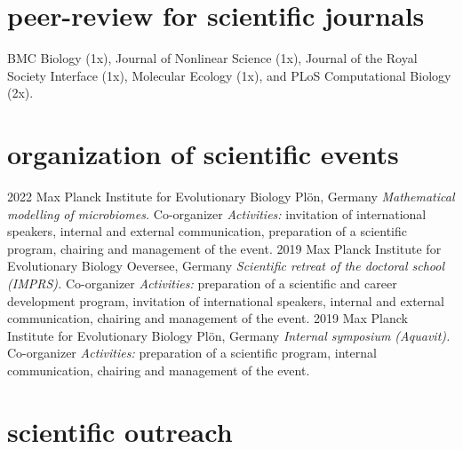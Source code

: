 \documentclass[]{friggeri-cv} %
\begin{document}
\section{peer-review for scientific journals}
BMC Biology (1x),  Journal of Nonlinear Science (1x), Journal of the Royal Society Interface (1x), Molecular Ecology (1x), and PLoS Computational Biology (2x).

\section{organization of scientific events}

\begin{entrylist}
\entry
{2022}
{}
{Max Planck Institute for Evolutionary Biology}
{Plön, Germany}
{{\normalsize\emph{Mathematical modelling of microbiomes.} Co-organizer}}
{\emph{Activities:} invitation of international speakers, internal and external communication, preparation of a scientific program, chairing and management of the event.}
\entry
{2019}
{}
{Max Planck Institute for Evolutionary Biology}
{Oeversee, Germany}
{{\normalsize\emph{Scientific retreat of the doctoral school (IMPRS).} Co-organizer}}
{\emph{Activities:} preparation of a scientific and career development program, invitation of international speakers, internal and external communication, chairing and management of the event.}
\entry
{2019}
{}
{Max Planck Institute for Evolutionary Biology}
{Plön, Germany}
{{\normalsize\emph{Internal symposium (Aquavit).} Co-organizer}}
{\emph{Activities:} preparation of a scientific program, internal communication, chairing and management of the event.}
\end{entrylist}

\pagebreak
\section{scientific outreach}
\end{document}
